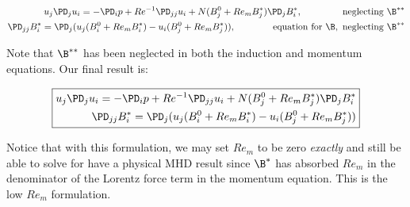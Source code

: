 \documentclass[11pt]{article}
\begin{document}
\begin{equation}\begin{aligned}
u_j\PD_j u_i =-\PD_i p+ Re^{-1} \PD_{jj} u_i + N (B_j^0+Re_m B_j^*) \PD_j B_i^*, \qquad \qquad \text{ neglecting } \B^{**}  \\
\PD_{jj} B_i^{*}  = \PD_j (u_j (B_i^0 + Re_m B_i^*) - u_i (B_j^0+Re_m B_j^*)), \qquad \qquad \text{equation for } \B, \text{ neglecting } \B^{**} \\
\end{aligned} \end{equation}

Note that $\B^{**}$ has been neglected in both the induction and momentum equations. Our final result is:

\begin{equation}\boxed{\begin{aligned}
u_j\PD_j u_i =-\PD_i p+ Re^{-1} \PD_{jj} u_i + N (B_j^0+Re_m B_j^*) \PD_j B_i^* \\
\PD_{jj} B_i^* = \PD_j (u_j (B_i^0 + Re_m B_i^{*}) - u_i (B_j^0+Re_m B_j^{*}))
\end{aligned}}\end{equation}

Notice that with this formulation, we may set $Re_m$ to be zero \textit{exactly} and still be able to solve for have a physical MHD result since $\B^*$ has absorbed $Re_m$ in the denominator of the Lorentz force term in the momentum equation. This is the low $Re_m$ formulation.
\end{document}
